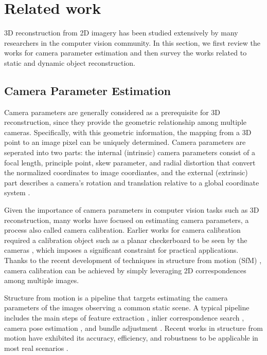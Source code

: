 \chapter{Related work}
\label{ch:related_work}

3D reconstruction from 2D imagery has been studied extensively by many researchers in the computer vision community. In this section, we first review the works for camera parameter estimation and then survey the works related to static and dynamic object reconstruction.

\section{Camera Parameter Estimation}
Camera parameters are generally considered as a prerequisite for 3D reconstruction, since they provide the geometric relationship among multiple cameras. Specifically, with this geometric information, the mapping from a 3D point to an image pixel can be uniquely determined.
Camera parameters are seperated into two parts: the internal (intrinsic) camera parameters consist of a focal length, principle point, skew parameter, and radial distortion that convert the normalized coordinates to image coordiantes, and the external (extrinsic) part describes a camera's rotation and translation relative to a global coordinate system \cite{Hartley2004}. 

Given the importance of camera parameters in computer vision tasks such as 3D reconstruction, many works have focused on estimating camera parameters, a process also called camera calibration. Earlier works for camera calibration required a calibration object such as a planar checkerboard to be seen by the cameras \cite{conf/cvpr/SturmM99,zhang2000flexible,caltoolbox}, which imposes a significant constraint for practical applications. Thanks to the recent development of techniques in structure from motion (SfM) \cite{Snavely2,snavely2008modeling,WuVSFM,wilson2013network,heinly2014_duplicate_structure,schoenberger2015paige,Heinly,heinly_dissertation,zheng2015_structureless_resection}, camera calibration can be achieved by simply leveraging 2D correspondences among multiple images. 

Structure from motion is a pipeline that targets estimating the camera parameters of the images observing a common static scene. A typical pipeline includes the main steps of feature extraction \cite{lowe2004_sift,rublee2011_orb,bay2008_surf}, inlier correspondence search \cite{raguram2013usac}, camera pose estimation \cite{nister2003_five_point,kneip2011novel,zheng2014general,zheng2015_structureless_resection}, and bundle adjustment \cite{agarwal2010_ba,wu2011_multicore_ba}. Recent works  in structure from motion have exhibited its accuracy, efficiency, and robustness to be applicable in most real scenarios \cite{Snavely2,WuVSFM}.


